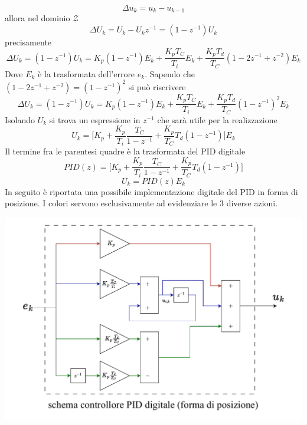 \documentclass[10pt, letterpaper]{report}
\begin{document}
$$ \Delta u_k = u_k-u_{k-1}$$ 
allora nel dominio $\mathcal Z$
$$ \Delta U_k = U_k-U_kz^{-1}=(1-z^{-1})U_k$$
precisamente
$$ 
\Delta U_k =(1-z^{-1})U_k= K_p(1-z^{-1})E_k+\frac{K_pT_C}{T_i}E_k+\frac{K_pT_d}{T_C}(1-2z^{-1}+z^{-2})E_k
$$
Dove $E_k$ è la trasformata dell'errore $e_k$. Sapendo che $(1-2z^{-1}+z^{-2})=(1-z^{-1})^2$ si può riscrivere  
$$ 
\Delta U_k =(1-z^{-1})U_k=  K_p(1-z^{-1})E_k+\frac{K_pT_C}{T_i}E_k+\frac{K_pT_d}{T_C}(1-z^{-1})^2E_k
$$
Isolando $U_k$ si trova un espressione in $z^{-1}$ che sarà utile per la realizzazione
$$ 
U_k=\Big[ K_p+\frac{K_p}{T_i}\frac{T_C}{1-z^{-1}}+\frac{K_p}{T_C}T_d(1-z^{-1})  \Big]E_k
$$
Il termine fra le parentesi quadre è la trasformata del PID digitale
$$ 
PID(z)=\Big[ K_p+\frac{K_p}{T_i}\frac{T_C}{1-z^{-1}}+\frac{K_p}{T_C}T_d(1-z^{-1})  \Big]
$$
$$ 
U_k=PID(z)E_k
$$
In seguito è riportata una possibile implementazione digitale del PID in forma di posizione. I colori servono esclusivamente ad evidenziare le 3 diverse azioni.
\begin{center}
    \includegraphics[width=1\textwidth]{images/schemaPIDdigitale.pdf}
\end{center}
\end{document}
